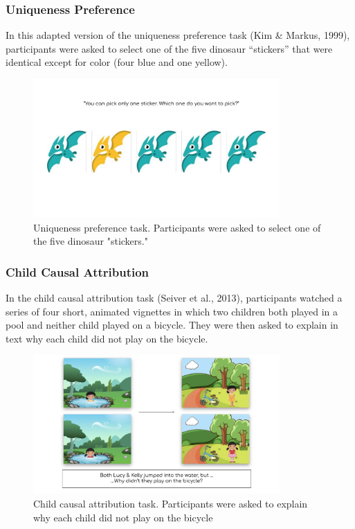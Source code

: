 \documentclass[
  man,floatsintext]{apa6}
\begin{document}
\hypertarget{uniqueness-preference-2}{%
\subsubsection{Uniqueness Preference}\label{uniqueness-preference-2}}

In this adapted version of the uniqueness preference task (Kim \& Markus, 1999), participants were asked to select one of the five dinosaur ``stickers'' that were identical except for color (four blue and one yellow).

\begin{figure}[!h]

{\centering \includegraphics[width=1\linewidth,height=200px]{CCRR_manuscript_files/appendix_task_examples/e1_uniqueness} 

}

\caption{Uniqueness preference task. Participants were asked to select one of the five dinosaur "stickers."}\label{fig:uniqueness}
\end{figure}

\hypertarget{child-causal-attribution-2}{%
\subsubsection{Child Causal Attribution}\label{child-causal-attribution-2}}

In the child causal attribution task (Seiver et al., 2013), participants watched a series of four short, animated vignettes in which two children both played in a pool and neither child played on a bicycle. They were then asked to explain in text why each child did not play on the bicycle.

\begin{figure}[!h]

{\centering \includegraphics[width=1\linewidth,height=200px]{CCRR_manuscript_files/appendix_task_examples/e1_ca_child} 

}

\caption{Child causal attribution task. Participants were asked to explain why each child did not play on the bicycle}\label{fig:ca-child}
\end{figure}
\end{document}
